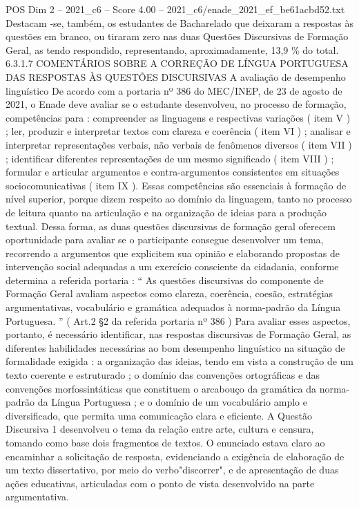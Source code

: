 \begin{textsample}{POS Dim 2 – 2021\_c6 – Score 4.00 – 2021\_c6/enade\_2021\_ef\_be61acbd52.txt}
Destacam -se, também, os estudantes de Bacharelado que deixaram a respostas às questões em branco, ou tiraram zero nas duas Questões Discursivas de Formação Geral, as tendo respondido, representando, aproximadamente, 13,9 \% do total. 6.3.1.7 COMENTÁRIOS SOBRE A CORREÇÃO DE LÍNGUA PORTUGUESA DAS RESPOSTAS ÀS QUESTÕES DISCURSIVAS A avaliação de desempenho linguístico De acordo com a portaria nº 386 do MEC/INEP, de 23 de agosto de 2021, o Enade deve avaliar se o estudante desenvolveu, no processo de formação, competências para : compreender as linguagens e respectivas variações ( item V ) ; ler, produzir e interpretar textos com clareza e coerência ( item VI ) ; analisar e interpretar representações verbais, não verbais de fenômenos diversos ( item VII ) ; identificar diferentes representações de um mesmo significado ( item VIII ) ; formular e articular argumentos e contra-argumentos consistentes em situações sociocomunicativas ( item IX ).
Essas competências são essenciais à formação de nível superior, porque dizem respeito ao domínio da linguagem, tanto no processo de leitura quanto na articulação e na organização de ideias para a produção textual.
Dessa forma, as duas questões discursivas de formação geral oferecem oportunidade para avaliar se o participante consegue desenvolver um tema, recorrendo a argumentos que explicitem sua opinião e elaborando propostas de intervenção social adequadas a um exercício consciente da cidadania, conforme determina a referida portaria : “ As questões discursivas do componente de Formação Geral avaliam aspectos como clareza, coerência, coesão, estratégias argumentativas, vocabulário e gramática adequados à norma-padrão da Língua Portuguesa. ” ( Art.2 §2 da referida portaria nº 386 ) Para avaliar esses aspectos, portanto, é necessário identificar, nas respostas discursivas de Formação Geral, as diferentes habilidades necessárias ao bom desempenho linguístico na situação de formalidade exigida : a organização das ideias, tendo em vista a construção de um texto coerente e estruturado ; o domínio das convenções ortográficas e das convenções morfossintáticas que constituem o arcabouço da gramática da norma-padrão da Língua Portuguesa ; e o domínio de um vocabulário amplo e diversificado, que permita uma comunicação clara e eficiente.
A Questão Discursiva 1 desenvolveu o tema da relação entre arte, cultura e censura, tomando como base dois fragmentos de textos.
O enunciado estava claro ao encaminhar a solicitação de resposta, evidenciando a exigência de elaboração de um texto dissertativo, por meio do verbo"discorrer", e de apresentação de duas ações educativas, articuladas com o ponto de vista desenvolvido na parte argumentativa.

\end{textsample}
